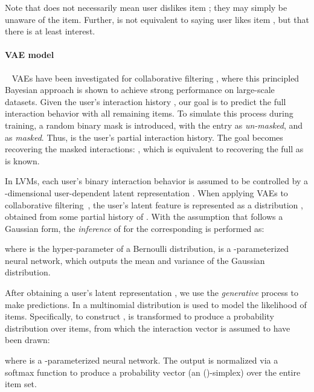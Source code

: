 \documentclass{article} \usepackage{iclr2020_conference,times}
\begin{document}
Note that  does not necessarily mean user  dislikes item ;
they may simply be unaware of the item.
Further,  is not equivalent to saying user  likes item , but that there is at least interest.





\paragraph{VAE model}~\hspace{-4mm}
VAEs have been investigated for collaborative filtering \citep{liang2018variational}, where this principled Bayesian approach is shown to achieve strong performance on large-scale datasets.
Given the user's interaction history , our goal is to predict the full interaction behavior with all remaining items. 
To simulate this process during training, a random binary mask  is introduced, with the entry  as {\it un-masked}, and  as {\it masked}. Thus,   is the user's partial interaction history. The goal becomes recovering the masked interactions: , which is equivalent to recovering the full  as  is known.

In LVMs, each user's binary interaction behavior is assumed to be controlled by a -dimensional user-dependent latent representation . When applying VAEs to collaborative filtering~\citep{liang2018variational}, the user's latent feature  is represented as a distribution , obtained from some partial history  of . With the assumption that  follows a Gaussian form, the {\em inference} of  for the corresponding  is performed as:

where  is the hyper-parameter of a Bernoulli distribution,  is a -parameterized neural network, which outputs the mean  and variance  of the Gaussian distribution. 



After obtaining a user's latent representation , we use the {\em generative} process to make predictions. In \citet{liang2018variational} a multinomial distribution is used to model the likelihood of items.
Specifically, to construct ,  is transformed to produce a probability distribution  over  items, from which the interaction vector  is assumed to
have been drawn:
\vspace{-0mm}

where  is a -parameterized neural network. 
The output  is normalized via a softmax function to produce a probability vector 
(an ()-simplex) over the entire item set.
\end{document}
